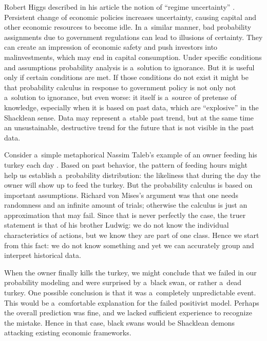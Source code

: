 Robert Higgs described in his article the notion of ``regime uncertainty'' 
\parencite[][]{higgs_regime_1997}. %
 Persistent change of economic policies increases uncertainty, causing capital and other economic resources to become idle. In a~similar manner, bad probability assignments due to government regulations can lead to illusions of certainty. They can create an impression of economic safety and push investors into malinvestments, which may end in capital consumption. Under specific conditions and assumptions probability analysis is a~solution to ignorance. But it is useful only if certain conditions are met. If those conditions do not exist it might be that probability calculus in response to government policy is not only not a~solution to ignorance, but even worse: it itself is a~source of pretense of knowledge, especially when it is based on past data, which are ``explosive'' in the Shacklean sense. Data may represent a~stable past trend, but at the same time an unsustainable, destructive trend for the future that is not visible in the past data.



Consider a~simple metaphorical Nassim Taleb's example of an owner feeding his turkey each day 
\parencite[][]{taleb_black_2007}. %
 Based on past behavior, the pattern of feeding hours might help us establish a~probability distribution: the likeliness that during the day the owner will show up to feed the turkey. But the probability calculus is based on important assumptions. Richard von Mises's argument was that one needs randomness and an infinite amount of trials; otherwise the calculus is just an approximation that may fail. Since that is never perfectly the case, the truer statement is that of his brother Ludwig: we do not know the individual characteristics of actions, but we know they are part of one class. Hence we start from this fact: we do not know something and yet we can accurately group and interpret historical data.



When the owner finally kills the turkey, we might conclude that we failed in our probability modeling and were surprised by a~black swan, or rather a~dead turkey. One possible conclusion is that it was a~completely unpredictable event. This would be a~comfortable explanation for the failed positivist model. Perhaps the overall prediction was fine, and we lacked sufficient experience to recognize the mistake. Hence in that case, black swans would be Shacklean demons attacking existing economic frameworks.



